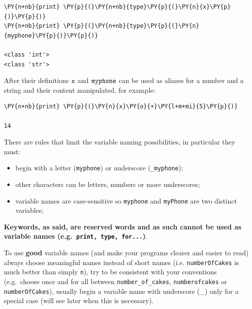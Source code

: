 \begin{tcolorbox}[breakable, size=fbox, boxrule=1pt, pad at break*=1mm, colback=cellbackground, colframe=cellborder]
\begin{Verbatim}[commandchars=\\\{\}]
\PY{n+nb}{print} \PY{p}{(}\PY{n+nb}{type}\PY{p}{(}\PY{n}{x}\PY{p}{)}\PY{p}{)}
\PY{n+nb}{print} \PY{p}{(}\PY{n+nb}{type}\PY{p}{(}\PY{n}{myphone}\PY{p}{)}\PY{p}{)}

<class 'int'>
<class 'str'>
\end{Verbatim}
\end{tcolorbox}

After their definitions \(\tt{x}\) and \(\tt{myphone}\) can be used as aliases for a number and a string and their content manipulated, for example:

\begin{tcolorbox}[breakable, size=fbox, boxrule=1pt, pad at break*=1mm, colback=cellbackground, colframe=cellborder]
\begin{Verbatim}[commandchars=\\\{\}]
\PY{n+nb}{print} \PY{p}{(}\PY{n}{x}\PY{o}{+}\PY{l+m+mi}{5}\PY{p}{)}

14
\end{Verbatim}
\end{tcolorbox}

There are rules that limit the variable naming possibilities, in particular they must:
\begin{itemize}
	\tightlist
\item begin with a letter (\texttt{myphone}) or underscore (\texttt{\_myphone});
\item other characters can be letters, numbers or more underscores;
\item variable names are case-sensitive so \texttt{myphone} and \texttt{myPhone} are two distinct variables;
\end{itemize}

\textbf{Keywords, as said, are reserved words and as such cannot be used as variable names (e.g.~\texttt{print, type, for...})}.

To use \textbf{good} variable names (and make your programs clearer and easier to read) always choose meaningful names instead of short names (i.e. \texttt{numberOfCakes} is much better than simply \texttt{n}), try to be consistent with your conventions (e.g.~choose once and for all between \texttt{number\_of\_cakes}, \texttt{numberofcakes} or \texttt{numberOfCakes}), usually begin a variable name with underscore (\_) only for a special case (will see later when this is necessary).

